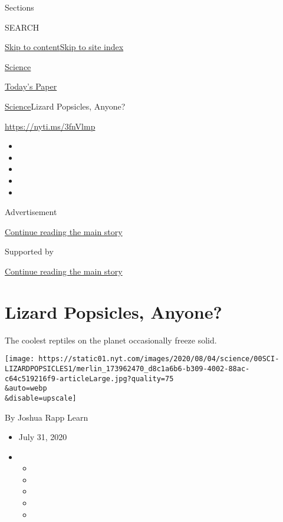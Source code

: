 Sections

SEARCH

\protect\hyperlink{site-content}{Skip to
content}\protect\hyperlink{site-index}{Skip to site index}

\href{https://www.nytimes.com/section/science}{Science}

\href{https://myaccount.nytimes.com/auth/login?response_type=cookie\&client_id=vi}{}

\href{https://www.nytimes.com/section/todayspaper}{Today's Paper}

\href{/section/science}{Science}\textbar{}Lizard Popsicles, Anyone?

\url{https://nyti.ms/3fnVlmp}

\begin{itemize}
\item
\item
\item
\item
\item
\end{itemize}

Advertisement

\protect\hyperlink{after-top}{Continue reading the main story}

Supported by

\protect\hyperlink{after-sponsor}{Continue reading the main story}

\hypertarget{lizard-popsicles-anyone}{%
\section{Lizard Popsicles, Anyone?}\label{lizard-popsicles-anyone}}

The coolest reptiles on the planet occasionally freeze solid.

\texttt{[image: https://static01.nyt.com/images/2020/08/04/science/00SCI-LIZARDPOPSICLES1/merlin\_173962470\_d8c1a6b6-b309-4002-88ac-c64c519216f9-articleLarge.jpg?quality=75\\\&auto=webp\\\&disable=upscale]}

By Joshua Rapp Learn

\begin{itemize}
\item
  July 31, 2020
\item
  \begin{itemize}
  \item
  \item
  \item
  \item
  \item
  \end{itemize}
\end{itemize}


